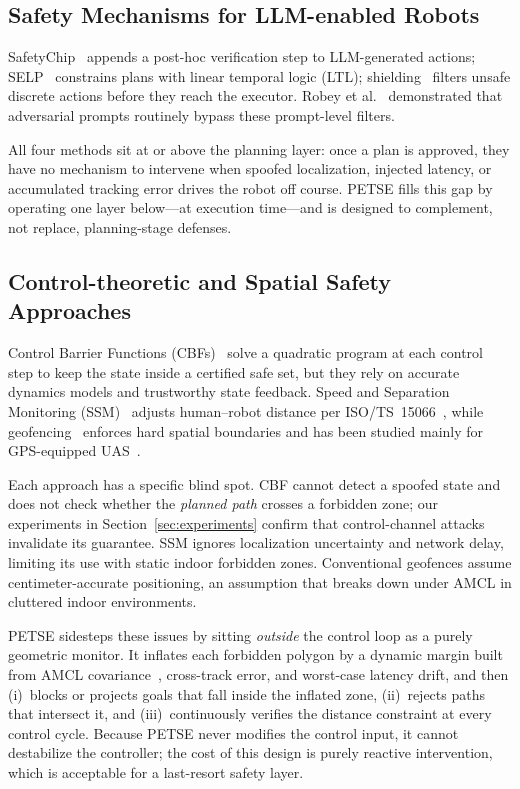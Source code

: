 \documentclass[conference]{IEEEtran}
\begin{document}
\subsection{Safety Mechanisms for LLM-enabled Robots}
SafetyChip~\cite{yang2024plug} appends a post-hoc verification step to LLM-generated actions; SELP~\cite{wu2025selp} constrains plans with linear temporal logic (LTL); shielding~\cite{alshiekh2018safe} filters unsafe discrete actions before they reach the executor. Robey et al.~\cite{robey2025jailbreaking} demonstrated that adversarial prompts routinely bypass these prompt-level filters.

All four methods sit at or above the planning layer: once a plan is approved, they have no mechanism to intervene when spoofed localization, injected latency, or accumulated tracking error drives the robot off course. PETSE fills this gap by operating one layer below---at execution time---and is designed to complement, not replace, planning-stage defenses.

\subsection{Control-theoretic and Spatial Safety Approaches}
Control Barrier Functions (CBFs)~\cite{ames2017control,ames2019control} solve a quadratic program at each control step to keep the state inside a certified safe set, but they rely on accurate dynamics models and trustworthy state feedback. Speed and Separation Monitoring (SSM)~\cite{iso2016robots,marvel2017implementing} adjusts human--robot distance per ISO/TS~15066~\cite{rosenstrauch2017safe}, while geofencing~\cite{stevens2021geofence,vagal2021new} enforces hard spatial boundaries and has been studied mainly for GPS-equipped UAS~\cite{villani2018survey}.

Each approach has a specific blind spot. CBF cannot detect a spoofed state and does not check whether the \emph{planned path} crosses a forbidden zone; our experiments in Section~\ref{sec:experiments} confirm that control-channel attacks invalidate its guarantee. SSM ignores localization uncertainty and network delay, limiting its use with static indoor forbidden zones. Conventional geofences assume centimeter-accurate positioning, an assumption that breaks down under AMCL in cluttered indoor environments.

PETSE sidesteps these issues by sitting \emph{outside} the control loop as a purely geometric monitor. It inflates each forbidden polygon by a dynamic margin built from AMCL covariance~\cite{fox1999monte,fox2003adapting}, cross-track error, and worst-case latency drift, and then (i)~blocks or projects goals that fall inside the inflated zone, (ii)~rejects paths that intersect it, and (iii)~continuously verifies the distance constraint at every control cycle. Because PETSE never modifies the control input, it cannot destabilize the controller; the cost of this design is purely reactive intervention, which is acceptable for a last-resort safety layer.
\end{document}
